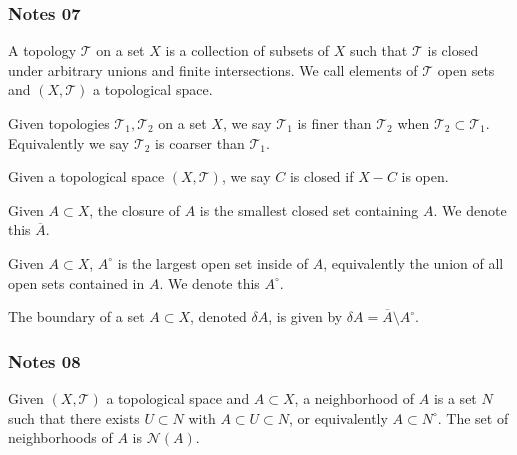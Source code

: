 \documentclass[12pt,letterpaper,reqno]{article}
\begin{document}
\subsubsection{Notes 07}

\begin{definition}[Topology]\label{def:topology}
    A topology $\mathcal{T}$ on a set $X$ is a collection of subsets of $X$ such that $\mathcal{T}$ is closed under arbitrary unions and finite intersections. We call elements of $\mathcal{T}$ open sets and $(X, \mathcal{T})$ a topological space.
\end{definition}

\begin{definition}\label{def:comparison-of-topologies}
    Given topologies $\mathcal{T}_{1}, \mathcal{T}_{2}$ on a set $X$, we say $\mathcal{T}_{1}$ is finer than $\mathcal{T}_{2}$ when $\mathcal{T_{2}} \subset \mathcal{T_{1}}$. Equivalently we say $\mathcal{T}_{2}$ is coarser than $\mathcal{T}_{1}$.
\end{definition}

\begin{definition}[Closed]\label{def:closed}
    Given a topological space $(X, \mathcal{T})$, we say $C$ is closed if $X-C$ is open.
\end{definition}

\begin{definition}[Closure]\label{def:closure}
    Given $A \subset X$, the closure of $A$ is the smallest closed set containing $A$. We denote this $\overline{A}$.
\end{definition}

\begin{definition}[Interior]\label{def:interior}
    Given $ A\subset X$, $A^{\circ}$ is the largest open set inside of $A$, equivalently the union of all open sets contained in $A$. We denote this $A^{\circ}.$
\end{definition}

\begin{definition}[Boundary]\label{def:boundary}
    The boundary of a set $A \subset X$, denoted $\delta A$, is given by $\delta A = \overline{A} \setminus A^{\circ}$.
\end{definition}

\subsubsection{Notes 08}

\begin{definition}[Neighborhood]\label{def:neighborhood}
    Given $(X, \mathcal{T})$ a topological space and $A \subset X$, a neighborhood of $A$ is a set $N$ such that there exists $U \subset N$ with $A \subset U \subset N$, or equivalently $A \subset N^{\circ}$. The set of neighborhoods of $A$ is $\mathcal{N}(A)$.
\end{definition}
\end{document}
